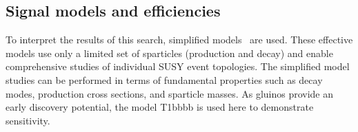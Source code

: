 





\subsection{Signal models and efficiencies\label{sec:signal}}
To interpret the results of this search, simplified
models~\cite{Alwall:2008ag,Alwall:2008va,sms} are used. These
effective models use only a limited set of sparticles (production and
decay) and enable comprehensive studies of individual SUSY event
topologies. The simplified model studies can be performed in terms of
fundamental properties such as decay modes, production cross sections,
and sparticle masses. As gluinos provide an early discovery potential, the model
T1bbbb is used here to demonstrate sensitivity.

